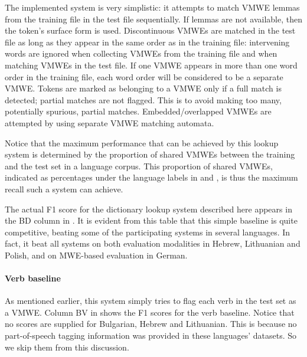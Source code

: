 \documentclass[output=paper
,modfonts
,nonflat,draftmode]{langsci/langscibook}
\begin{document}
The implemented system is very simplistic: it attempts to match VMWE lemmas from the training file in the test file sequentially. If lemmas are not available, then the token's surface form is used. Discontinuous VMWEs are matched in the test file as long as they appear in the same order as in the training file: intervening words are ignored when collecting VMWEs from the training file and when matching VMWEs in the test file. If one VMWE appears in more than one word order in the training file, each word order will be considered to be a separate VMWE. Tokens are marked as belonging to a VMWE only if a full match is detected; partial matches are not flagged. This is to avoid making too many, potentially spurious, partial matches. Embedded/overlapped VMWEs are attempted by using separate VMWE matching automata.

Notice that the maximum performance that can be achieved by this lookup system is determined by the proportion of shared VMWEs between the training and the test set in a language corpus. This proportion of shared VMWEs, indicated as percentages under the language labels in  and , is thus the maximum recall such a system can achieve. 

The actual F1 score for the dictionary lookup system described here appears in the BD column in . It is evident from this table that this simple baseline is quite competitive, beating some of the participating systems in several languages. In fact, it beat all systems on both evaluation modalities in Hebrew, Lithuanian and Polish, and on MWE-based evaluation in German.

\paragraph*{Verb baseline}


As mentioned earlier, this system simply tries to flag each verb in the test set as a VMWE. Column BV in  shows the F1 scores for the verb baseline. Notice that no scores are supplied for Bulgarian, Hebrew and Lithuanian. This is because no part-of-speech tagging information was provided in these languages' datasets. So we skip them from this discussion.
\end{document}
